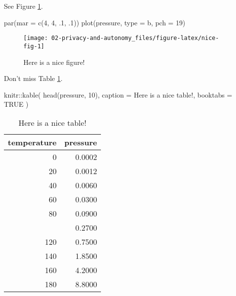 \documentclass[
]{book}
\newenvironment{Shaded}{\begin{snugshade}}{\end{snugshade}}
\newcommand{\AttributeTok}[1]{\textcolor[rgb]{0.77,0.63,0.00}{#1}}
\newcommand{\ConstantTok}[1]{\textcolor[rgb]{0.00,0.00,0.00}{#1}}
\newcommand{\DecValTok}[1]{\textcolor[rgb]{0.00,0.00,0.81}{#1}}
\newcommand{\FunctionTok}[1]{\textcolor[rgb]{0.00,0.00,0.00}{#1}}
\newcommand{\NormalTok}[1]{#1}
\newcommand{\SpecialCharTok}[1]{\textcolor[rgb]{0.00,0.00,0.00}{#1}}
\newcommand{\StringTok}[1]{\textcolor[rgb]{0.31,0.60,0.02}{#1}}
\theoremstyle{definition}
\theoremstyle{definition}
\theoremstyle{definition}
\theoremstyle{definition}
\theoremstyle{remark}
\begin{document}
See Figure \ref{fig:nice-fig}.

\begin{Shaded}
\begin{Highlighting}[]
\FunctionTok{par}\NormalTok{(}\AttributeTok{mar =} \FunctionTok{c}\NormalTok{(}\DecValTok{4}\NormalTok{, }\DecValTok{4}\NormalTok{, .}\DecValTok{1}\NormalTok{, .}\DecValTok{1}\NormalTok{))}
\FunctionTok{plot}\NormalTok{(pressure, }\AttributeTok{type =} \StringTok{\textquotesingle{}b\textquotesingle{}}\NormalTok{, }\AttributeTok{pch =} \DecValTok{19}\NormalTok{)}
\end{Highlighting}
\end{Shaded}

\begin{figure}

{\centering \texttt{[image: 02-privacy-and-autonomy\_files/figure-latex/nice-fig-1]} 

}

\caption{Here is a nice figure!}\label{fig:nice-fig}
\end{figure}

Don't miss Table \ref{tab:nice-tab}.

\begin{Shaded}
\begin{Highlighting}[]
\NormalTok{knitr}\SpecialCharTok{::}\FunctionTok{kable}\NormalTok{(}
  \FunctionTok{head}\NormalTok{(pressure, }\DecValTok{10}\NormalTok{), }\AttributeTok{caption =} \StringTok{\textquotesingle{}Here is a nice table!\textquotesingle{}}\NormalTok{,}
  \AttributeTok{booktabs =} \ConstantTok{TRUE}
\NormalTok{)}
\end{Highlighting}
\end{Shaded}

\begin{table}

\caption{\label{tab:nice-tab}Here is a nice table!}
\centering
\begin{tabular}[t]{rr}
\toprule
temperature & pressure\\
\midrule
0 & 0.0002\\
20 & 0.0012\\
40 & 0.0060\\
60 & 0.0300\\
80 & 0.0900\\
\addlinespace
100 & 0.2700\\
120 & 0.7500\\
140 & 1.8500\\
160 & 4.2000\\
180 & 8.8000\\
\bottomrule
\end{tabular}
\end{table}
\end{document}
